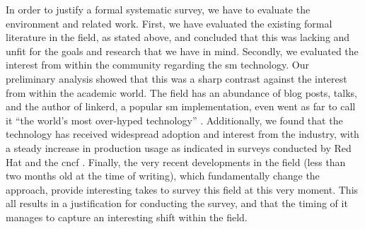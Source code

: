 In order to justify a formal systematic survey, we have to evaluate the environment and related work. First, we have evaluated the existing formal literature in the field, as stated above, and concluded that this was lacking and unfit for the goals and research that we have in mind. Secondly, we evaluated the interest from within the community regarding the \gls{sm} technology. Our preliminary analysis showed that this was a sharp contrast against the interest from within the academic world. The field has an abundance of blog posts, talks, and the author of \gls{linkerd}, a popular \gls{sm} implementation, even went as far to call it “the world’s most over-hyped technology” \cite{service-mesh-hype}. Additionally, we found that the technology has received widespread adoption and interest from the industry, with a steady increase in production usage as indicated in surveys conducted by Red Hat \cite{rh-survey} and the \gls{cncf} \cite{cncf-survey-2020}. Finally, the very recent developments \cite{istio-merbridge, cilium-ebpf-mesh} in the field (less than two months old at the time of writing), which fundamentally change the approach, provide  interesting takes to survey this field at this very moment. This all results in a justification for conducting the survey, and that the timing of it manages to capture an interesting shift within the field.

